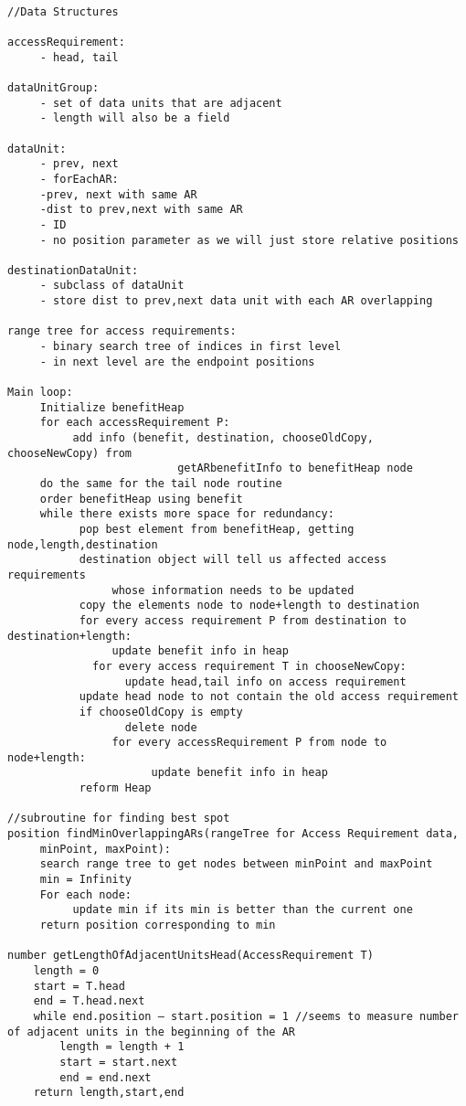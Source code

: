 \documentclass[11pt,psfig]{article}
\begin{document}
\begin{verbatim}

//Data Structures

accessRequirement:
     - head, tail

dataUnitGroup:
     - set of data units that are adjacent
     - length will also be a field

dataUnit:
     - prev, next
     - forEachAR:
     -prev, next with same AR
     -dist to prev,next with same AR
     - ID
     - no position parameter as we will just store relative positions

destinationDataUnit:
     - subclass of dataUnit
     - store dist to prev,next data unit with each AR overlapping

range tree for access requirements:
     - binary search tree of indices in first level
     - in next level are the endpoint positions

Main loop:
     Initialize benefitHeap
     for each accessRequirement P:
          add info (benefit, destination, chooseOldCopy, chooseNewCopy) from   
					      getARbenefitInfo to benefitHeap node
     do the same for the tail node routine
     order benefitHeap using benefit
     while there exists more space for redundancy:
           pop best element from benefitHeap, getting node,length,destination
           destination object will tell us affected access requirements 
                whose information needs to be updated
           copy the elements node to node+length to destination
           for every access requirement P from destination to destination+length:
                update benefit info in heap
	         for every access requirement T in chooseNewCopy:
	              update head,tail info on access requirement
           update head node to not contain the old access requirement
           if chooseOldCopy is empty
	              delete node
                for every accessRequirement P from node to node+length:
                      update benefit info in heap
           reform Heap

//subroutine for finding best spot
position findMinOverlappingARs(rangeTree for Access Requirement data, 
     minPoint, maxPoint):
     search range tree to get nodes between minPoint and maxPoint
     min = Infinity
     For each node:
          update min if its min is better than the current one
     return position corresponding to min

number getLengthOfAdjacentUnitsHead(AccessRequirement T)
	length = 0
	start = T.head
	end = T.head.next
	while end.position – start.position = 1 //seems to measure number of adjacent units in the beginning of the AR
		length = length + 1
		start = start.next
		end = end.next
	return length,start,end


\end{verbatim}
\end{document}
